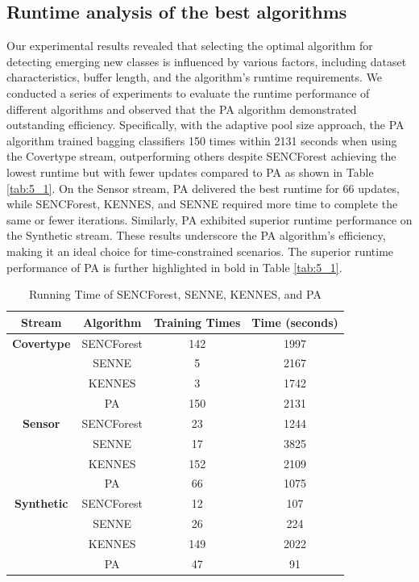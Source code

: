 \subsection{Runtime analysis of the best algorithms}
Our experimental results revealed that selecting the optimal algorithm for detecting emerging new classes is influenced by various factors, including dataset characteristics, buffer length, and the algorithm's runtime requirements. We conducted a series of experiments to evaluate the runtime performance of different algorithms and observed that the PA algorithm demonstrated outstanding efficiency. Specifically, with the adaptive pool size approach, the PA algorithm trained bagging classifiers 150 times within 2131 seconds when using the Covertype stream, outperforming others despite SENCForest achieving the lowest runtime but with fewer updates compared to PA as shown in Table \ref{tab:5_1}. On the Sensor stream, PA delivered the best runtime for 66 updates, while SENCForest, KENNES, and SENNE required more time to complete the same or fewer iterations. Similarly, PA exhibited superior runtime performance on the Synthetic stream. These results underscore the PA algorithm’s efficiency, making it an ideal choice for time-constrained scenarios. The superior runtime performance of PA is further highlighted in bold in Table \ref{tab:5_1}.
\begin{table}[!ht]
  \centering
  \caption{Running Time of SENCForest, SENNE, KENNES, and PA}
  \label{table:5_2}
  \begin{tabular}{|c|c|c|c|}
  \hline
  \textbf{Stream}  & \textbf{Algorithm} & \textbf{Training Times} & \textbf{Time (seconds)} \\ \hline
  \textbf{Covertype} & SENCForest & 142 & 1997 \\ \cline{2-4} 
   & SENNE & 5 & 2167 \\ \cline{2-4} 
   & KENNES & 3 & 1742 \\ \cline{2-4} 
   & PA & 150 & 2131 \\ \hline
  \textbf{Sensor} & SENCForest & 23 & 1244 \\ \cline{2-4} 
   & SENNE & 17 & 3825 \\ \cline{2-4} 
   & KENNES & 152 & 2109 \\ \cline{2-4} 
   & PA & 66 & 1075 \\ \hline
  \textbf{Synthetic} & SENCForest & 12 & 107 \\ \cline{2-4} 
   & SENNE & 26 & 224 \\ \cline{2-4} 
   & KENNES & 149 & 2022 \\ \cline{2-4} 
   & PA & 47 & 91 \\ \hline
  \end{tabular}
  \end{table}
